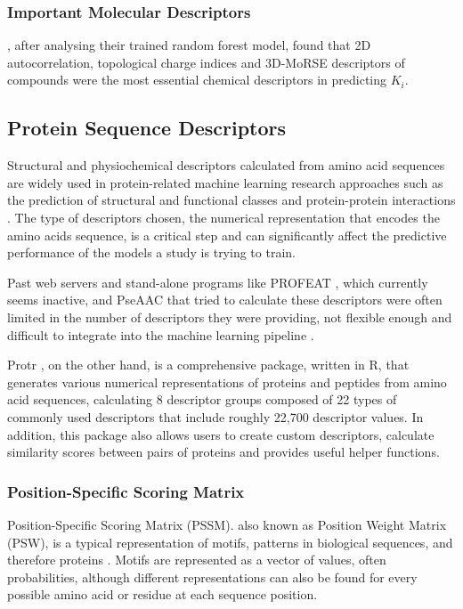 \subsubsection{Important Molecular Descriptors}

\citet{Shar2016}, after analysing their trained random forest model, found that 2D autocorrelation, topological charge indices and 3D-MoRSE descriptors of compounds were the most essential chemical descriptors in predicting $K_i$. 

\subsection{Protein Sequence Descriptors}
\label{subsec:Protein_Sequence_Descriptors}

Structural and physiochemical descriptors calculated from amino acid sequences are widely used in protein-related machine learning research approaches such as the prediction of structural and functional classes and protein-protein interactions \citep{ProtR_Paper}. The type of descriptors chosen, the numerical representation that encodes the amino acids sequence, is a critical step and can significantly affect the predictive performance of the models a study is trying to train. 

Past web servers and stand-alone programs like PROFEAT \citep{PROFEAT}, which currently seems inactive, and PseAAC \citep{PseAAC} that tried to calculate these descriptors were often limited in the number of descriptors they were providing, not flexible enough and difficult to integrate into the machine learning pipeline \citep{ProtR_Paper}.

Protr \citep{ProtR_Paper}, on the other hand, is a comprehensive package, written in R, that generates various numerical representations of proteins and peptides from amino acid sequences, calculating 8 descriptor groups composed of 22 types of commonly used descriptors that include roughly 22,700 descriptor values. In addition, this package also allows users to create custom descriptors, calculate similarity scores between pairs of proteins and provides useful helper functions.

\subsubsection{Position-Specific Scoring Matrix}
\label{subsubsec:PSSM}

Position-Specific Scoring Matrix (PSSM). also known as Position Weight Matrix (PSW), is a typical representation of motifs, patterns in biological sequences, and therefore proteins \citep{Jiang2020, Encyclopedia}. Motifs are represented as a vector of values, often probabilities, although different representations can also be found for every possible amino acid or residue at each sequence position. 

